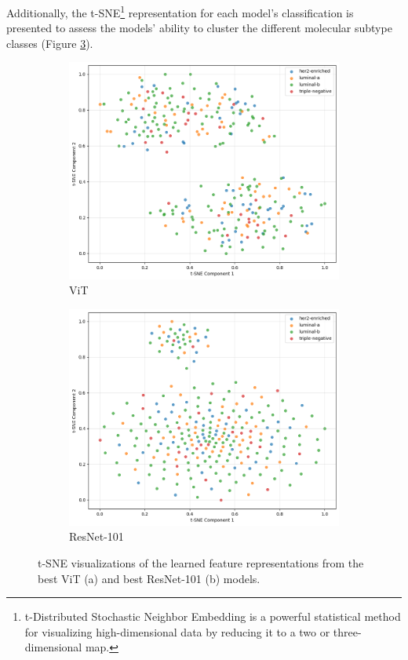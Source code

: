 \documentclass[a4paper,10pt]{book}
\begin{document}
Additionally, the t-SNE\footnote{t-Distributed Stochastic Neighbor Embedding is a powerful statistical method for visualizing high-dimensional data by reducing it to a two or three-dimensional map.} representation for each model's classification is presented to assess the models' ability to cluster the different molecular subtype classes (Figure \ref{fig:tsne_vit_resnet}).

\begin{figure}[h!]
    \centering
    \begin{subfigure}[t]{0.48\textwidth}
        \centering
        \includegraphics[width=\textwidth]{reports/assets/TSNE-VIT.png}
        \caption{ViT}
        \label{fig:tsne_vit}
    \end{subfigure}
    \begin{subfigure}[t]{0.48\textwidth}
        \centering
        \includegraphics[width=\textwidth]{reports/assets/TSNE-ResNet.png}
        \caption{ResNet-101}
        \label{fig:tsne_resnet}
    \end{subfigure}
    \caption[t-SNE Visualizations Best ViT vs. Best ResNet-101]{t-SNE visualizations of the learned feature representations from the best ViT (a) and best ResNet-101 (b) models.}
    \label{fig:tsne_vit_resnet}
\end{figure}
\end{document}
